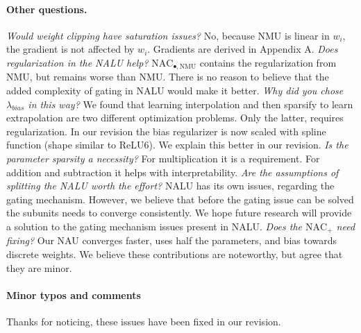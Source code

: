\documentclass{article}
\begin{document}
\vspace{-0.3cm} \paragraph{Other questions.} \textit{Would weight clipping have saturation issues?} No, because NMU is linear in $w_i$, the gradient is not affected by $w_i$. Gradients are derived in Appendix A. \textit{Does regularization in the NALU help?} $\mathrm{NAC}_{\bullet, \mathrm{NMU}}$ contains the regularization from NMU, but remains worse than NMU. There is no reason to believe that the added complexity of gating in NALU would make it better. \textit{Why did you chose $\lambda_{bias}$ in this way?} We found that learning interpolation and then sparsify to learn extrapolation are two different optimization problems. Only the latter, requires regularization. In our revision the bias regularizer is now scaled with spline function (shape similar to ReLU6). We explain this better in our revision. \textit{Is the parameter sparsity a necessity?} For multiplication it is a requirement. For addition and subtraction it helps with interpretability. \textit{Are the assumptions of splitting the NALU worth the effort?} NALU has its own issues, regarding the gating mechanism. However, we believe that before the gating issue can be solved the subunits needs to converge consistently. We hope future research will provide a solution to the gating mechanism issues present in NALU. \textit{Does the $\mathrm{NAC}_{+}$ need fixing?} Our NAU converges faster, uses half the parameters, and bias towards discrete weights. We believe these contributions are noteworthy, but agree that they are minor.

\vspace{-0.3cm} \paragraph{Minor typos and comments} Thanks for noticing, these issues have been fixed in our revision.
\end{document}
